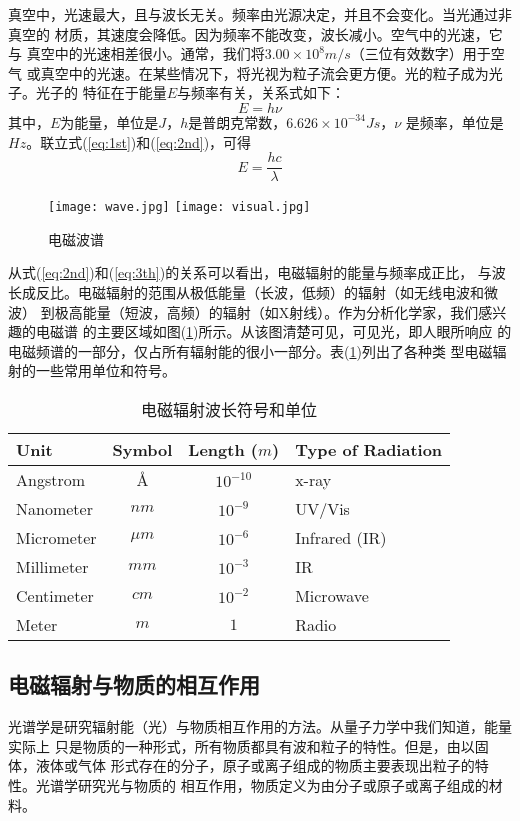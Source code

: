 真空中，光速最大，且与波长无关。频率由光源决定，并且不会变化。当光通过非真空的
材质，其速度会降低。因为频率不能改变，波长减小。空气中的光速，它与
真空中的光速相差很小。通常，我们将$3.00\times 10^8 m/s$（三位有效数字）用于空气
或真空中的光速。在某些情况下，将光视为粒子流会更方便。光的粒子成为光子。光子的
特征在于能量$E$与频率有关，关系式如下：
\begin{equation}
    E = h\nu
    \label{eq:2nd}
\end{equation}
其中，$E$为能量，单位是$J$，$h$是普朗克常数，$6.626\times 10^{-34} Js$，$\nu$
是频率，单位是$Hz$。联立式(\ref{eq:1st})和(\ref{eq:2nd})，可得
\begin{equation}
    E = \frac{hc}{\lambda}
    \label{eq:3th}
\end{equation}
\begin{figure}[htbp]
    \centering
    \texttt{[image: wave.jpg]}
    \texttt{[image: visual.jpg]}
    \caption{电磁波谱}
    \label{fig:wavegraph}
\end{figure}
从式(\ref{eq:2nd})和(\ref{eq:3th})的关系可以看出，电磁辐射的能量与频率成正比，
与波长成反比。电磁辐射的范围从极低能量（长波，低频）的辐射（如无线电波和微波）
到极高能量（短波，高频）的辐射（如X射线）。作为分析化学家，我们感兴趣的电磁谱
的主要区域如图(\ref{fig:wavegraph})所示。从该图清楚可见，可见光，即人眼所响应
的电磁频谱的一部分，仅占所有辐射能的很小一部分。表(\ref{tab:1st})列出了各种类
型电磁辐射的一些常用单位和符号。
\begin{table}[htbp]
    \centering
    \caption{电磁辐射波长符号和单位}
    \label{tab:1st}
    \begin{tabular}{lccl}
        \hline
        {\bf Unit}&{\bf Symbol}&{\bf Length ($m$)}&{\bf Type of Radiation}\\
        \hline
        Angstrom & \AA& $10^{-10}$&x-ray\\
        Nanometer& $nm$& $10^{-9}$&UV/Vis\\
        Micrometer& $\mu m$& $10^{-6}$&Infrared (IR)\\
        Millimeter& $mm$& $10^{-3}$&IR\\
        Centimeter& $cm$& $10^{-2}$&Microwave\\
        Meter& $m$& $1$&Radio\\
        \hline
    \end{tabular}
\end{table}
\subsection{电磁辐射与物质的相互作用}
光谱学是研究辐射能（光）与物质相互作用的方法。从量子力学中我们知道，能量实际上
只是物质的一种形式，所有物质都具有波和粒子的特性。但是，由以固体，液体或气体
形式存在的分子，原子或离子组成的物质主要表现出粒子的特性。光谱学研究光与物质的
相互作用，物质定义为由分子或原子或离子组成的材料。

